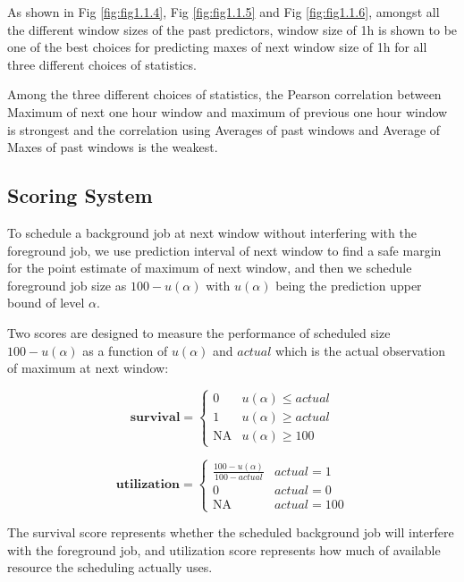 \documentclass{article}
\begin{document}
\begin{flushleft}
As shown in Fig \ref{fig:fig1.1.4}, Fig \ref{fig:fig1.1.5} and Fig
\ref{fig:fig1.1.6}, amongst all the different window sizes of the past
predictors, window size of 1h is shown to be one of the best choices for
predicting maxes of next window size of 1h for all three different choices of
statistics.

Among the three different choices of statistics, the Pearson correlation between
Maximum of next one hour window and maximum of previous one hour window is
strongest and the correlation using Averages of past windows and Average of
Maxes of past windows is the weakest.
\end{flushleft}

\subsection{Scoring System}

\begin{flushleft}
To schedule a background job at next window without interfering with the
foreground job, we use prediction interval of next window to find a safe margin
for the point estimate of maximum of next window, and then we schedule
foreground job size as $100 - u(\alpha)$ with $u(\alpha)$ being the prediction
upper bound of level $\alpha$.

Two scores are designed to measure the performance of scheduled size $100 -
u(\alpha)$ as a function of $u(\alpha)$ and $actual$ which is the actual
observation of maximum at next window:

\begin{equation}
    \mathbf{survival} =
    \begin{cases}
    0 & u(\alpha) \leq actual \\
    1 & u(\alpha) \geq actual \\
    \text{NA} & u(\alpha) \geq 100
    \end{cases}
\end{equation}

\begin{equation}
    \mathbf{utilization} =
   \begin{cases} 
    \frac{100 - u(\alpha)}{100 - actual} & actual = 1  \\
    0 & actual = 0 \\
    \text{NA} & actual = 100
   \end{cases}
\end{equation}

The survival score represents whether the scheduled background job will
interfere with the foreground job, and utilization score represents how much of
available resource the scheduling actually uses.
\end{flushleft}
\end{document}
